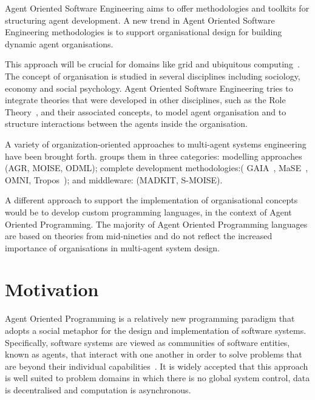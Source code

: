 \documentclass[a4paper,12pt,oneside,fleqn]{book} %
\begin{document}
Agent Oriented Software Engineering aims to offer methodologies and
toolkits for structuring agent development. A new trend in Agent Oriented
Software Engineering methodologies is to support organisational design for
building dynamic agent organisations.

This approach will be crucial for domains like grid and ubiquitous
computing~\cite{luck2005agent}. The concept of organisation is studied in
several disciplines including sociology, economy and social psychology.
Agent Oriented Software Engineering tries to integrate theories that were
developed in other disciplines, such as the Role
Theory~\cite{biddle1986recent}, and their associated concepts, to model
agent organisation and to structure interactions between the agents inside
the organisation. 



A variety of organization-oriented approaches to multi-agent systems
engineering have been brought forth. \cite{DBLP:conf/se/Wester-EbbinghausMRM07} groups them in three categories: modelling
approaches (AGR, MOISE, ODML); complete development methodologies:(
GAIA~\cite{DBLP:journals/tosem/ZambonelliJW03}, MaSE~\cite{deloach2001analysis},
OMNI, Tropos~\cite{DBLP:conf/aose/GiunchigliaMP02}); and middleware:
(MADKIT, S-MOISE).


A different approach to support the implementation of organisational
concepts would be to develop custom programming languages, in the context
of Agent Oriented Programming. The majority of Agent Oriented Programming
languages are based on theories from mid-nineties and do not reflect the
increased importance of organisations in multi-agent system design.
\section{Motivation}
Agent Oriented Programming is a relatively new programming paradigm that
adopts a social metaphor for the design and implementation of software
systems.  Specifically, software systems are viewed as communities of
software entities, known as agents, that interact with one another in order
to solve problems that are beyond their individual
capabilities~\cite{DBLP:journals/ai/Shoham93}. It is widely accepted that
this approach is well suited to problem domains in which there is no global
system control, data is decentralised and computation is asynchronous.
\end{document}
